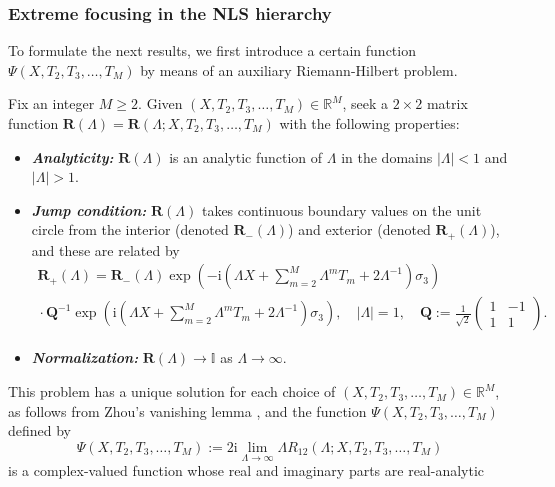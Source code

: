 \documentclass[12pt]{amsart}
\numberwithin{equation}{section}
\newcommand{\ii}{\mathrm{i}}
\begin{document}
\subsubsection{Extreme focusing in the NLS hierarchy}
\label{sec:extreme}
To formulate the next results, we first introduce a certain function $\Psi(X,T_2,T_3,\dots,T_M)$ by means of an auxiliary Riemann-Hilbert problem.
\begin{myrhp}
Fix an integer $M\ge 2$.  Given $(X,T_2,T_3,\dots,T_M)\in\mathbb{R}^M$, seek a $2\times 2$ matrix function $\mathbf{R}(\Lambda)=\mathbf{R}(\Lambda;X,T_2,T_3,\dots,T_M)$ with the following properties:
\begin{itemize}
\item[]\textit{\textbf{Analyticity:}} $\mathbf{R}(\Lambda)$ is an analytic function of $\Lambda$ in the domains $|\Lambda|< 1$ and $|\Lambda|>1$. 
\item[]\textit{\textbf{Jump condition:}} $\mathbf{R}(\Lambda)$ takes continuous boundary values on the unit circle from the interior (denoted $\mathbf{R}_-(\Lambda)$) and exterior (denoted $\mathbf{R}_+(\Lambda)$), and these are related by 
\begin{multline}
\mathbf{R}_+(\Lambda)=\mathbf{R}_-(\Lambda)\exp\left(-\ii \left(\Lambda X+\sum_{m=2}^M\Lambda^mT_m + 2\Lambda^{-1}\right)\sigma_3\right)\\
{}\cdot\mathbf{Q}^{-1}\exp\left(\ii \left(\Lambda X+\sum_{m=2}^M\Lambda^mT_m+ 2\Lambda^{-1}\right)\sigma_3\right), \quad|\Lambda|=1,\quad
\mathbf{Q}:=\frac{1}{\sqrt{2}}\begin{pmatrix}1&-1\\1 & 1\end{pmatrix}.
\label{eq:RWIO-jump}
\end{multline}
\item[]\textit{\textbf{Normalization:}} $\mathbf{R}(\Lambda)\to\mathbb{I}$ as $\Lambda\to\infty$.
\end{itemize}
\label{rhp:RWIO}
\end{myrhp}
This problem has a unique solution for each choice of $(X,T_2,T_3,\dots,T_M)\in\mathbb{R}^M$, as follows from Zhou's vanishing lemma \cite{Zhou89}, and the function $\Psi(X,T_2,T_3,\dots,T_M)$ defined by
\begin{equation}
\Psi(X,T_2,T_3,\dots,T_M):=2\ii\lim_{\Lambda\to\infty}\Lambda R_{12}(\Lambda;X,T_2,T_3,\dots,T_M)
\label{eq:RWIO-extract}
\end{equation}
is a complex-valued function whose real and imaginary parts are real-analytic 
\end{document}
